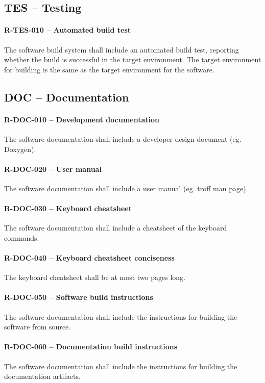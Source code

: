 \subsection{TES -- Testing}
\paragraph{R-TES-010 -- Automated build test}
The software build system shall include an automated build test, reporting
whether the build is successful in the target environment.
The target environment for building is the same as the target environment for
the software.

\subsection{DOC -- Documentation}
\paragraph{R-DOC-010 -- Development documentation}
The software documentation shall include a developer design document (eg.
Doxygen).

\paragraph{R-DOC-020 -- User manual}
The software documentation shall include a user manual (eg. troff man page).

\paragraph{R-DOC-030 -- Keyboard cheatsheet}
The software documentation shall include a cheatsheet of the keyboard commands.

\paragraph{R-DOC-040 -- Keyboard cheatsheet conciseness}
The keyboard cheatsheet shall be at most two pages long.

\paragraph{R-DOC-050 -- Software build instructions}
The software documentation shall include the instructions for building
the software from source.

\paragraph{R-DOC-060 -- Documentation build instructions}
The software documentation shall include the instructions for building
the documentation artifacts.

